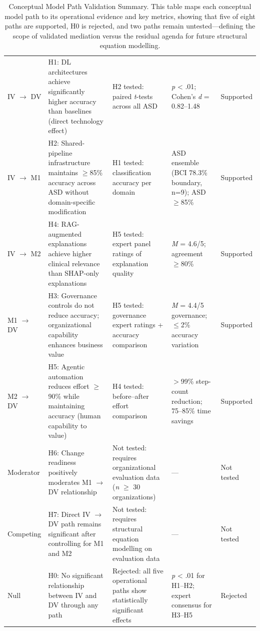 {\tablestripes\tablefontsize
{}
\begin{xltabular}{\textwidth}{@{} >{\raggedright\arraybackslash}p{2.0cm} p{4.6cm} p{3.7cm} p{2.8cm} >{\raggedright\arraybackslash}p{2.0cm} @{}}
\caption[Conceptual Model Path Validation Summary]{Conceptual Model Path Validation Summary. This table maps each conceptual model path to its operational evidence and key metrics, showing that five of eight paths are supported, H0 is rejected, and two paths remain untested---defining the scope of validated mediation versus the residual agenda for future structural equation modelling.}\label{tab:conceptual_validation} \\
\toprule
{} &  &  &  &  \\
\midrule
\endfirsthead
\endhead
\bottomrule
\endlastfoot
IV $\to$ DV & H1: DL architectures achieve significantly higher accuracy than baselines (direct technology effect) & H2 tested: paired \textit{t}-tests across all ASD & \textit{p} < .01; Cohen's \textit{d} = 0.82--1.48 & Supported \\
\addlinespace
IV $\to$ M1 & H2: Shared-pipeline infrastructure maintains $\geq$85\% accuracy across ASD without domain-specific modification & H1 tested: classification accuracy per domain & \asdacc{} ASD ensemble (BCI 78.3\% boundary, n=9); ASD $\geq$85\% & Supported \\
\addlinespace
IV $\to$ M2 & H4: RAG-augmented explanations achieve higher clinical relevance than SHAP-only explanations & H5 tested: expert panel ratings of explanation quality & \textit{M} = 4.6/5; agreement $\geq$80\% & Supported \\
\addlinespace
M1 $\to$ DV & H3: Governance controls do not reduce accuracy; organizational capability enhances business value & H5 tested: governance expert ratings + accuracy comparison & \textit{M} = 4.4/5 governance; $\leq$2\% accuracy variation & Supported \\
\addlinespace
M2 $\to$ DV & H5: Agentic automation reduces effort $\geq$90\% while maintaining accuracy (human capability to value) & H4 tested: before--after effort comparison & $>$99\% step-count reduction; 75--85\% time savings & Supported \\
\addlinespace
Moderator & H6: Change readiness positively moderates M1 $\to$ DV relationship & Not tested: requires organizational evaluation data (\textit{n} $\geq$ 30 organizations) & --- & Not tested \\
\addlinespace
Competing & H7: Direct IV $\to$ DV path remains significant after controlling for M1 and M2 & Not tested: requires structural equation modelling on evaluation data & --- & Not tested \\
\addlinespace
Null & H0: No significant relationship between IV and DV through any path & Rejected: all five operational paths show statistically significant effects & \textit{p} < .01 for H1--H2; expert consensus for H3--H5 & Rejected \\
\end{xltabular}}
